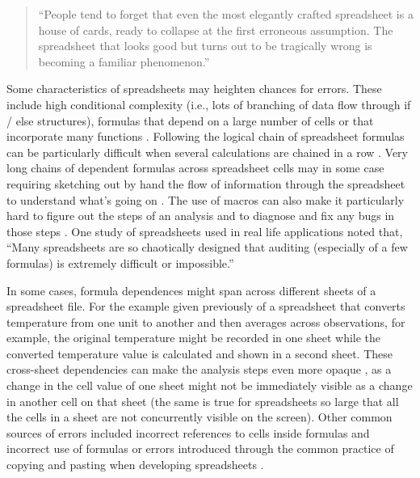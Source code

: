 \documentclass[]{tufte-book}
\begin{document}
\begin{quote}
``People tend to forget that even the most elegantly crafted spreadsheet is a
house of cards, ready to collapse at the first erroneous assumption. The
spreadsheet that looks good but turns out to be tragically wrong is becoming
a familiar phenomenon.'' \citep{levy1984spreadsheet}
\end{quote}

Some characteristics of spreadsheets may heighten chances for errors. These
include high conditional complexity (i.e., lots of branching of data flow
through if / else structures), formulas that depend on a large number of cells
or that incorporate many functions \citep{hermans2016spreadsheets}. Following the
logical chain of spreadsheet formulas can be particularly difficult when several
calculations are chained in a row \citep{hermans2015enron}. Very long chains of
dependent formulas across spreadsheet cells may in some case requiring sketching
out by hand the flow of information through the spreadsheet to understand what's
going on \citep{nardi1990spreadsheet}. The use of macros can also make it
particularly hard to figure out the steps of an analysis and to diagnose and fix
any bugs in those steps \citep{nash2006spreadsheets, creeth1985microcomputer}. One
study of spreadsheets used in real life applications noted that, ``Many
spreadsheets are so chaotically designed that auditing (especially of a few
formulas) is extremely difficult or impossible.'' \citep{powell2009errors}

In some cases, formula dependences might span across different sheets of a
spreadsheet file. For the example given previously of a spreadsheet that converts
temperature from one unit to another and then averages across observations, for
example, the original temperature might be recorded in one sheet while the
converted temperature value is calculated and shown in a second sheet. These
cross-sheet dependencies can make the analysis steps even more opaque
\citep{hermans2016spreadsheets}, as a change in the cell value of one sheet might not
be immediately visible as a change in another cell on that sheet (the same is
true for spreadsheets so large that all the cells in a sheet are not
concurrently visible on the screen). Other common sources of errors included
incorrect references to cells inside formulas and incorrect use of formulas
\citep{powell2009errors} or errors introduced through the common practice of copying
and pasting when developing spreadsheets \citep{hermans2016spreadsheets}.
\end{document}
